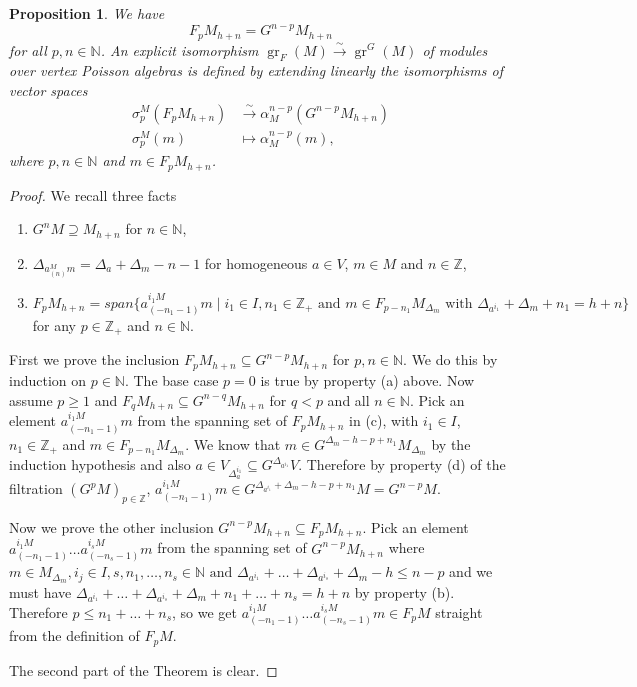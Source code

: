 \documentclass[12pt,a4paper]{article}
\newtheorem{proposition}{Proposition}
\DeclareMathOperator{\gr}{gr}
\begin{document}
\begin{proposition}
  \label{prp:4}
  We have
  \begin{equation*}
    F_pM_{h+n}=G^{n-p}M_{h+n}
  \end{equation*}
  for all $p,n\in \mathbb{N}$.
  An explicit isomorphism $\gr_F(M)\xrightarrow{\sim} \gr^G(M)$ of modules over vertex Poisson algebras is defined by extending linearly the isomorphisms of vector spaces
  \begin{align*}
    \sigma^M_p(F_pM_{h+n})&\xrightarrow{\sim} \alpha^{n-p}_M(G^{n-p}M_{h+n}) \\
    \sigma^M_p(m)&\mapsto \alpha^{n-p}_M(m),
  \end{align*}
  where $p,n\in \mathbb{N}$ and $m\in F_pM_{h+n}$.
\end{proposition}
\begin{proof}
  We recall three facts
  \begin{enumerate}[label={(\alph*)}]
  \item $G^nM\supseteq M_{h+n}$ for $n\in \mathbb{N}$,
  \item $\Delta_{a^M_{(n)}m}=\Delta_a+\Delta_m-n-1$ for homogeneous $a\in V$, $m\in M$ and $n\in \mathbb{Z}$,
  \item $F_pM_{h+n}=span\{a^{i_1M}_{(-n_1-1)}m\mid i_1\in I, n_1\in \mathbb{Z}_+\text{ and } m\in F_{p-n_1}M_{\Delta_m} \text{ with }\Delta_{a^{i_1}}+\Delta_m+n_1=h+n\}$ for any $p\in \mathbb{Z}_+$ and $n\in \mathbb{N}$.
  \end{enumerate}
  First we prove the inclusion $F_pM_{h+n}\subseteq G^{n-p}M_{h+n}$ for $p,n\in \mathbb{N}$.
  We do this by induction on $p\in \mathbb{N}$.
  The base case $p=0$ is true by property (a) above.
  Now assume $p\ge 1$ and $F_qM_{h+n}\subseteq G^{n-q}M_{h+n}$ for $q<p$ and all $n\in \mathbb{N}$.
  Pick an element $a^{i_1M}_{(-n_1-1)}m$ from the spanning set of $F_pM_{h+n}$ in (c), with $i_1\in I$, $n_1\in \mathbb{Z}_+$ and $m\in F_{p-n_1}M_{\Delta_m}$.
  We know that $m\in G^{\Delta_m-h-p+n_1}M_{\Delta_m}$ by the induction hypothesis and also $a\in V_{\Delta_a^{i_1}}\subseteq G^{\Delta_{a^{i_1}}}V$.
  Therefore by property (d) of the filtration $(G^pM)_{p\in\mathbb{Z}}$, $a^{i_1M}_{(-n_1-1)}m\in G^{\Delta_{a^{i_1}}+\Delta_m-h-p+n_1}M=G^{n-p}M$.

  Now we prove the other inclusion $G^{n-p}M_{h+n}\subseteq F_pM_{h+n}$.
  Pick an element $a^{i_1 M}_{(-n_1-1)}\dots a^{i_s M}_{(-n_s-1)}m$ from the spanning set of $G^{n-p}M_{h+n}$ where $m\in M_{\Delta_m}, i_j\in I, s,n_1,\dots, n_s\in \mathbb{N}\text{ and }\Delta_{a^{i_1}}+\dots+\Delta_{a^{i_s}}+\Delta_m-h\le n-p$ and we must have $\Delta_{a^{i_1}}+\dots+\Delta_{a^{i_s}}+\Delta_m+n_1+\dots+n_s=h+n$ by property (b).
  Therefore $p\le n_1+\dots+n_s$, so we get $a^{i_1 M}_{(-n_1-1)}\dots a^{i_s M}_{(-n_s-1)}m\in F_pM$ straight from the definition of $F_pM$.

  The second part of the Theorem is clear.
\end{proof}
\end{document}

